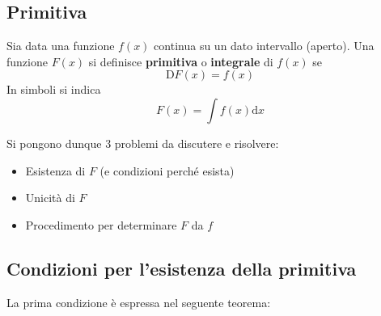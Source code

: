 \documentclass[10pt]{article}
\theoremstyle{plain}
\begin{document}
\subsection{Primitiva}
\begin{defin}
    Sia data una funzione $f(x)$ continua su un dato intervallo (aperto). Una funzione $F(x)$ si definisce \textbf{primitiva} o \textbf{integrale} di $f(x)$ se
    \[\textrm{D}F(x) = f(x)\]
    In simboli si indica
    \[F(x) = \int f(x) \textrm{d}x\]
\end{defin}
Si pongono dunque 3 problemi da discutere e risolvere:
\begin{itemize}
    \item Esistenza di $F$ (e condizioni perché esista)
    \item Unicità di $F$
    \item Procedimento per determinare $F$ da $f$
\end{itemize}
\subsection{Condizioni per l'esistenza della primitiva}
La prima condizione è espressa nel seguente teorema:
\end{document}
